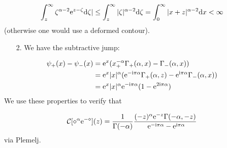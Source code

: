 \documentclass[12pt,a4paper]{article}
\def\D{ {\rm d} }
\def\I{ {\rm i} }
\def\E{ {\rm e} }
\def\CC{ {\cal C} }
\def\addtab#1={#1\;&=}
\def\ccr{\\\addtab}
\def\addtab#1={#1\;&=}
\def\ccr{\\\addtab}
\begin{document}
\[
\int_z^\infty \zeta^{\alpha-2} \E^{z-\zeta} \D \zeta| \leq \int_z^\infty |\zeta|^{\alpha-2} \D \zeta = \int_0^\infty |x+z|^{\alpha-2} \D x  < \infty
\]
(otherwise one would use a deformed contour). 

\begin{itemize}
\item[2. ] We have the subtractive jump:

\end{itemize}

\begin{align*}
\psi_+(x) - \psi_-(x) &= \E^x(x_+^{-\alpha} \Gamma_+(\alpha, x) -  \Gamma_-(\alpha, x)) \ccr
= \E^x |x|^\alpha (\E^{-\I \pi \alpha} \Gamma_+(\alpha, z) - \E^{\I \pi \alpha} \Gamma_-(\alpha,x)) \ccr
 = \E^x |x|^\alpha \E^{-\I \pi \alpha} (1-\E^{2 \I \pi \alpha})
\end{align*}
We use these properties to verify that

\[
\CC[\diamond^\alpha \E^{-\diamond}](z) = {1 \over \Gamma(-\alpha)} {(-z)^\alpha \E^{-z} \Gamma(-\alpha, - z) \over
  \E^{-\I\pi\alpha} - \E^{\I\pi\alpha}}
\]
via Plemelj.
\end{document}
